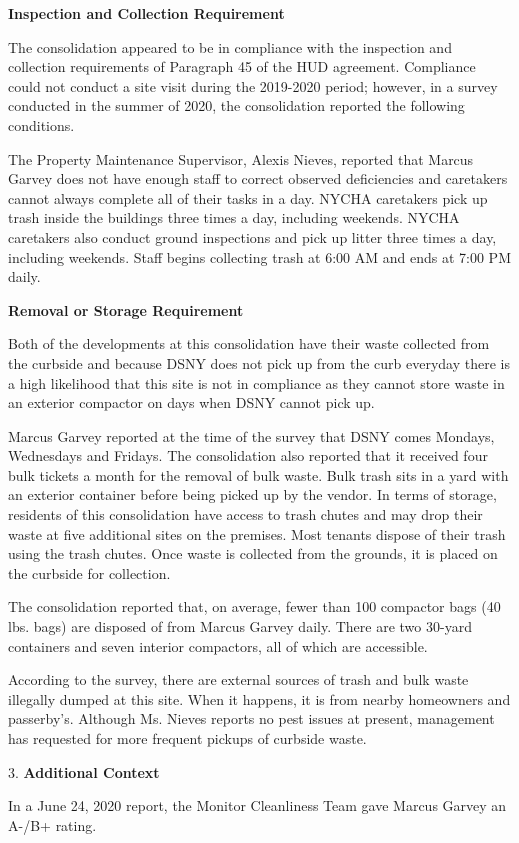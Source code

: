 

\textbf{Inspection and Collection Requirement}

The consolidation appeared to be in compliance with the inspection and collection requirements of Paragraph 45 of the HUD agreement. Compliance could not conduct a site visit during the 2019-2020 period; however, in a survey conducted in the summer of 2020, the consolidation reported the following conditions.

The Property Maintenance Supervisor, Alexis Nieves, reported that Marcus Garvey does not have enough staff to correct observed deficiencies and caretakers cannot always complete all of their tasks in a day. NYCHA caretakers pick up trash inside the buildings three times a day, including weekends. NYCHA caretakers also conduct ground inspections and pick up litter three times a day, including weekends. Staff begins collecting trash at 6:00 AM and ends at 7:00 PM daily.

\textbf{Removal or Storage Requirement}

Both of the developments at this consolidation have their waste collected from the curbside and because DSNY does not pick up from the curb everyday there is a high likelihood that this site is not in compliance as they cannot store waste in an exterior compactor on days when DSNY cannot pick up.

Marcus Garvey reported at the time of the survey that DSNY comes Mondays, Wednesdays and Fridays. The consolidation also reported that it received four bulk tickets a month for the removal of bulk waste. Bulk trash sits in a yard with an exterior container before being picked up by the vendor. In terms of storage, residents of this consolidation have access to trash chutes and may drop their waste at five additional sites on the premises. Most tenants dispose of their trash using the trash chutes. Once waste is collected from the grounds, it is placed on the curbside for collection. 

The consolidation reported that, on average, fewer than 100 compactor bags (40 lbs. bags) are disposed of from Marcus Garvey daily. There are two 30-yard containers and seven interior compactors, all of which are accessible. 

According to the survey, there are external sources of trash and bulk waste illegally dumped at this site. When it happens, it is from nearby homeowners and passerby's. Although Ms. Nieves reports no pest issues at present, management has requested for more frequent pickups of curbside waste. 

3. \textbf{Additional Context} 

In a June 24, 2020 report, the Monitor Cleanliness Team gave Marcus Garvey an A-/B+ rating. 
